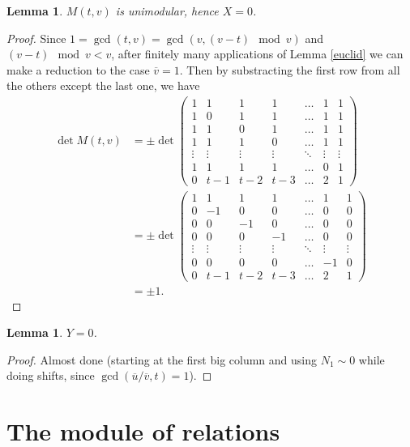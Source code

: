 \documentclass[12pt,a4paper]{article}
\newtheorem{lemma}[theorem]{Lemma}
\newcommand{\uo}{\overline{u}}
\newcommand{\vo}{\overline{v}}
\begin{document}
\begin{lemma}
$M(t,v)$ is unimodular, hence $X=0$.
\end{lemma}
\begin{proof}
Since $1=\gcd(t,v)=\gcd(v, (v-t)\mod v)$ %
 and $(v-t)\mod v<v$, after finitely many applications of Lemma \ref{euclid} we can make a reduction to the case $\vo=1$. Then by substracting the first row from all the others except the last one, we have
\begin{equation*}
\begin{split}
\det M(t,v)&=\pm \det
\begin{pmatrix}
 1 & 1 & 1 & 1 & \dots & 1 & 1\\ 
 1 & 0 & 1 & 1 & \dots & 1 & 1\\ 
 1 & 1 & 0 & 1 & \dots & 1 & 1\\ 
 1 & 1 & 1 & 0 & \dots & 1 & 1\\ 
\vdots & \vdots & \vdots & \vdots & \ddots & \vdots & \vdots\\ 
 1 & 1 & 1 & 1 & \dots & 0 & 1\\ 
 0 & t-1 & t-2 & t-3 & \dots  & 2 & 1
\end{pmatrix}\\
&=\pm \det
\begin{pmatrix}
 1 & 1 & 1 & 1 & \dots & 1 & 1\\ 
 0 & -1 & 0 & 0 & \dots & 0 & 0\\ 
 0 & 0 & -1 & 0 & \dots & 0 & 0\\ 
 0 & 0 & 0 & -1 & \dots & 0 & 0\\ 
\vdots & \vdots & \vdots & \vdots & \ddots & \vdots & \vdots\\ 
 0 & 0 & 0 & 0 & \dots & -1 & 0\\ 
 0 & t-1 & t-2 & t-3 & \dots  & 2 & 1
\end{pmatrix}\\
&=\pm 1.
\end{split}
\end{equation*}
\end{proof}

\begin{lemma}
$Y=0$.
\end{lemma}
\begin{proof}
Almost done (starting at the first big column and using $N_1\sim 0$ while doing shifts, since $\gcd(\uo/\vo,t)=1$).
\end{proof}
\section{The module of relations}
\end{document}
